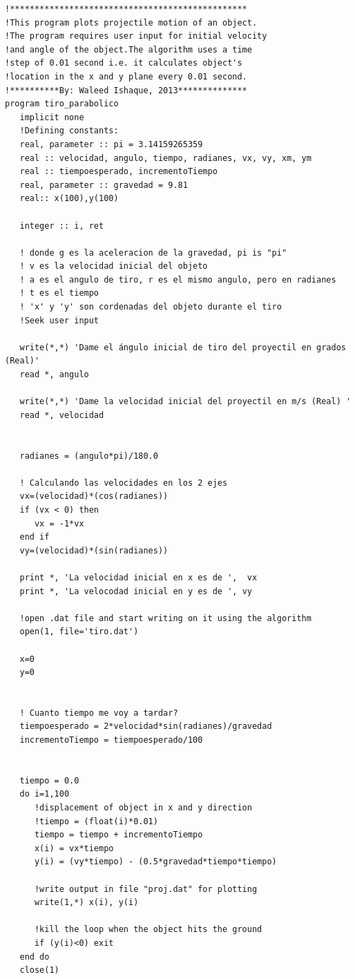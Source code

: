 \documentclass[10pt]{article}
\begin{document}
\begin{verbatim}
!************************************************ 
!This program plots projectile motion of an object.
!The program requires user input for initial velocity
!and angle of the object.The algorithm uses a time
!step of 0.01 second i.e. it calculates object's 
!location in the x and y plane every 0.01 second.
!**********By: Waleed Ishaque, 2013**************  
program tiro_parabolico
   implicit none
   !Defining constants: 
   real, parameter :: pi = 3.14159265359
   real :: velocidad, angulo, tiempo, radianes, vx, vy, xm, ym
   real :: tiempoesperado, incrementoTiempo
   real, parameter :: gravedad = 9.81
   real:: x(100),y(100)

   integer :: i, ret

   ! donde g es la aceleracion de la gravedad, pi is "pi"
   ! v es la velocidad inicial del objeto
   ! a es el angulo de tiro, r es el mismo angulo, pero en radianes
   ! t es el tiempo
   ! 'x' y 'y' son cordenadas del objeto durante el tiro
   !Seek user input

   write(*,*) 'Dame el ángulo inicial de tiro del proyectil en grados (Real)'
   read *, angulo

   write(*,*) 'Dame la velocidad inicial del proyectil en m/s (Real) '
   read *, velocidad


   radianes = (angulo*pi)/180.0

   ! Calculando las velocidades en los 2 ejes
   vx=(velocidad)*(cos(radianes))
   if (vx < 0) then
      vx = -1*vx
   end if
   vy=(velocidad)*(sin(radianes))

   print *, 'La velocidad inicial en x es de ',  vx
   print *, 'La velocodad inicial en y es de ', vy
    
   !open .dat file and start writing on it using the algorithm
   open(1, file='tiro.dat')

   x=0
   y=0


   ! Cuanto tiempo me voy a tardar?
   tiempoesperado = 2*velocidad*sin(radianes)/gravedad
   incrementoTiempo = tiempoesperado/100


   tiempo = 0.0
   do i=1,100
      !displacement of object in x and y direction
      !tiempo = (float(i)*0.01)
      tiempo = tiempo + incrementoTiempo
      x(i) = vx*tiempo
      y(i) = (vy*tiempo) - (0.5*gravedad*tiempo*tiempo)

      !write output in file "proj.dat" for plotting
      write(1,*) x(i), y(i)
        
      !kill the loop when the object hits the ground
      if (y(i)<0) exit
   end do
   close(1)


\end{verbatim}
\end{document}
